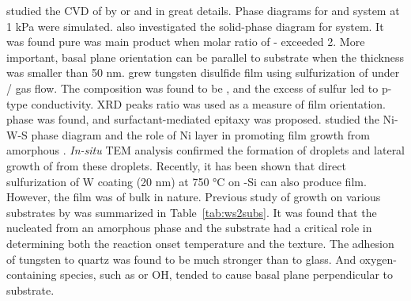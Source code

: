 \citeauthor{Lee1994} studied the CVD of  by  or  and  in great details. Phase diagrams for  and  system at 1 kPa were simulated.\cite{Lee1994} \citeauthor{Endler1999} also investigated the solid-phase diagram for  system.\cite{Endler1999} It was found pure  was main product when molar ratio of - exceeded 2. More important,  basal plane orientation can be parallel to substrate when the thickness was smaller than 50 nm. \citeauthor{Ennaoui1995a} grew tungsten disulfide film using sulfurization of  under / gas flow.\cite{Ennaoui1995a} The composition was found to be , and the excess of sulfur led to p-type conductivity. XRD peaks ratio was used as a measure of film orientation.  phase was found, and surfactant-mediated epitaxy was proposed. \citeauthor{Regula1997} studied the Ni-W-S phase diagram and the role of Ni layer in promoting  film growth from amorphous .\cite{Regula1997} \emph{In-situ} TEM analysis confirmed the formation of  droplets and lateral growth of  from these droplets.\cite{Regula1998} Recently, it has been shown that direct sulfurization of W coating (20 nm) at 750 \si{\degreeCelsius} on -Si can also produce  film.\cite{Shanmugam2012a} However, the film was of bulk in nature. Previous study of  growth on various substrates by \citeauthor{Genut1992} was summarized in Table~\ref{tab:ws2subs}.\cite{Genut1992} It was found that the  nucleated from an amorphous  phase and the substrate had a critical role in determining both the reaction onset temperature and the texture. The adhesion of tungsten to quartz was found to be much stronger than to glass. And oxygen-containing species, such as  or OH, tended to cause  basal plane perpendicular to substrate.
